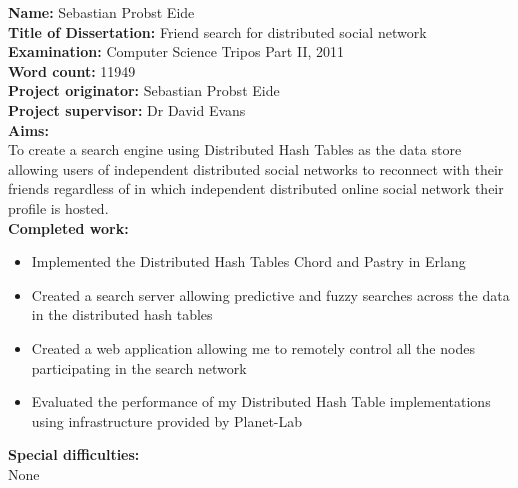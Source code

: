 \begin{flushleft}{

  \textbf{Name:} Sebastian Probst Eide \\
  \vspace*{5mm}
  \textbf{Title of Dissertation:} Friend search for distributed social network \\
  \vspace*{5mm}
  \textbf{Examination:} Computer Science Tripos Part II, 2011 \\
  \vspace*{5mm}
  \textbf{Word count:} 11949 \\
  \vspace*{5mm}
  \textbf{Project originator:} Sebastian Probst Eide \\
  \vspace*{5mm}
  \textbf{Project supervisor:} Dr David Evans \\
  \vspace*{15mm}
  \textbf{Aims:} \\
  \vspace*{2mm}
  To create a search engine using Distributed Hash Tables as the data store allowing users of independent distributed social networks to reconnect with their friends regardless of in which independent distributed online social network their profile is hosted. \\
  \vspace*{10mm}
  \textbf{Completed work:} \\
  \vspace*{2mm}
  \begin{itemize}
  \item Implemented the Distributed Hash Tables Chord and Pastry in Erlang
  \item Created a search server allowing predictive and fuzzy searches across the data in the distributed hash tables
  \item Created a web application allowing me to remotely control all the nodes participating in the search network
  \item Evaluated the performance of my Distributed Hash Table implementations using infrastructure provided by Planet-Lab
  \end{itemize}
  \vspace*{10mm}
  \textbf{Special difficulties:} \\
  \vspace*{2mm}
  None

} \end{flushleft}

\clearpage
